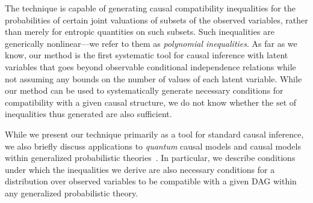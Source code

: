 The technique is capable of generating causal compatibility inequalities for the probabilities of certain joint valuations of subsets of the observed variables, rather than merely for entropic quantities on such subsets.  Such inequalities are generically nonlinear---we refer to them as \emph{polynomial inequalities}.
As far as we know, our method is the first systematic tool for causal inference with latent variables that goes beyond observable conditional independence relations while not assuming any bounds on the number of values of each latent variable. While our method can be used to systematically generate necessary conditions for compatibility with a given causal structure, we do not know whether the set of inequalities thus generated are also sufficient.  



While we present our technique primarily as a tool for standard causal inference, we also briefly discuss applications to {\em quantum} causal models and causal models within generalized probabilistic theories~\cite{fritz2012bell,pusey2014gdag,chaves2014informationinference,BeyondBellII}.  In particular, we describe conditions under which the inequalities we derive are also necessary conditions for a distribution over observed variables to be compatible with a given DAG within any generalized probabilistic theory. 


